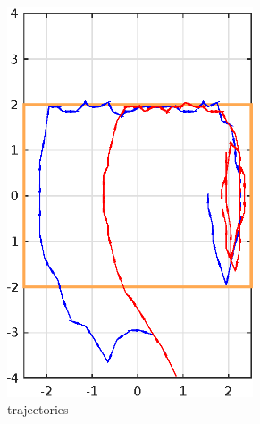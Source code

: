 \begin{figure}
\begin{subfigure}[b]{0.25\textwidth}
		\includegraphics[width=0.8\textwidth]{pic/traj}
		\caption{trajectories}
		\label{fig:traj}
	\end{subfigure}
	\begin{subfigure}[b]{0.25\textwidth}
		

\end{subfigure}
\end{figure}
